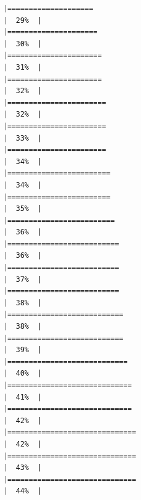 \documentclass[
]{book}
\begin{document}
\begin{verbatim}
|====================                                                  |  29%  |                                                                              |=====================                                                 |  30%  |                                                                              |======================                                                |  31%  |                                                                              |======================                                                |  32%  |                                                                              |=======================                                               |  32%  |                                                                              |=======================                                               |  33%  |                                                                              |=======================                                               |  34%  |                                                                              |========================                                              |  34%  |                                                                              |========================                                              |  35%  |                                                                              |=========================                                             |  36%  |                                                                              |==========================                                            |  36%  |                                                                              |==========================                                            |  37%  |                                                                              |==========================                                            |  38%  |                                                                              |===========================                                           |  38%  |                                                                              |===========================                                           |  39%  |                                                                              |============================                                          |  40%  |                                                                              |=============================                                         |  41%  |                                                                              |=============================                                         |  42%  |                                                                              |==============================                                        |  42%  |                                                                              |==============================                                        |  43%  |                                                                              |==============================                                        |  44%  |                                                                              
\end{verbatim}
\end{document}
